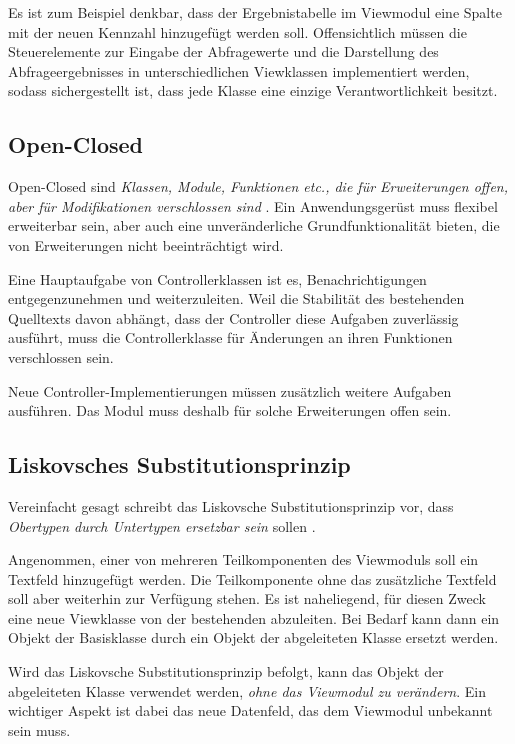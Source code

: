 \documentclass{vldb}
\begin{document}
Es ist zum Beispiel denkbar, dass der Ergebnistabelle im Viewmodul eine Spalte mit der neuen Kennzahl hinzugefügt werden soll. Offensichtlich müssen die Steuerelemente zur Eingabe der Abfragewerte und die Darstellung des Ab\-fra\-ge\-er\-geb\-nis\-ses in unterschiedlichen Viewklassen implementiert werden, sodass sichergestellt ist, dass jede Klasse eine einzige Verantwortlichkeit besitzt.

\subsection{Open-Closed}
Open-Closed sind \textit{Klassen, Module, Funktionen etc., die für Erweiterungen offen, aber für Modifikationen ver\-schlos\-sen sind} \cite[S.~99]{Marti13}. Ein Anwendungsgerüst muss flexibel erweiterbar sein, aber auch eine unveränderliche Grundfunktionalität bieten, die von Erweiterungen nicht beeinträchtigt wird.

Eine Hauptaufgabe von Controllerklassen ist es, Be\-nach\-rich\-ti\-gun\-gen entgegenzunehmen und weiterzuleiten. Weil die Stabilität des bestehenden Quelltexts davon abhängt, dass der Controller diese Aufgaben zuverlässig ausführt, muss die Controllerklasse für Änderungen an ihren Funktionen verschlossen sein.

Neue Controller-Implementierungen müs\-sen zusätzlich weitere Aufgaben ausführen. Das Modul muss deshalb für solche Erweiterungen offen sein.
\pagebreak

\subsection{Liskovsches Substitutionsprinzip}
Vereinfacht gesagt schreibt das Liskovsche Subs\-ti\-tu\-tions\-prin\-zip vor, dass \textit{Obertypen durch Untertypen ersetzbar sein} sollen \cite[S.~111]{Marti13}.

Angenommen, einer von mehreren Teil\-kom\-po\-nen\-ten des Viewmoduls soll ein Textfeld hinzugefügt werden. Die Teil\-kom\-po\-nente ohne das zusätzliche Textfeld soll aber weiterhin zur Verfügung stehen. Es ist naheliegend, für diesen Zweck eine neue Viewklasse von der bestehenden abzuleiten. Bei Bedarf kann dann ein Objekt der Basisklasse durch ein Objekt der abgeleiteten Klasse ersetzt werden.

Wird das Liskovsche Substitutionsprinzip befolgt, kann das Objekt der abgeleiteten Klasse verwendet werden, \textit{ohne das Viewmodul zu verändern}. Ein wichtiger Aspekt ist dabei das neue Datenfeld, das dem Viewmodul unbekannt sein muss.
\end{document}
